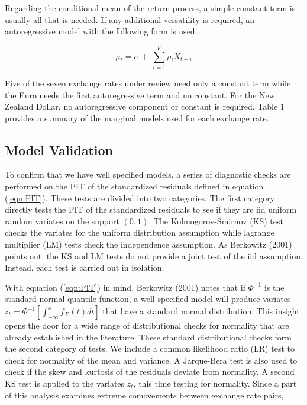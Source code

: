 \documentclass[12pt]{article}
\begin{document}
Regarding the conditional mean of the return process, a simple constant term is usually all that is needed. If any additional versatility is required, an autoregressive model with the following form is used.

\begin{equation} \label{eqn:AR}
\mu_{t} = c ~+~ \sum_{i = 1}^{p} \rho_{i} X_{t - i}
\end{equation}

Five of the seven exchange rates under review need only a constant term while the Euro needs the first autoregressive term and no constant. For the New Zealand Dollar, no autoregressive component or constant is required. Table 1 provides a summary of the marginal models used for each exchange rate.

\subsection{Model Validation}

To confirm that we have well specified models, a series of diagnostic checks are performed on the PIT of the standardized residuals defined in equation (\ref{eqn:PIT}). These tests are divided into two categories. The first category directly tests the PIT of the standardized residuals to see if they are iid uniform random variates on the support $\left(0,1\right)$. The Kolmogorov-Smirnov (KS) test checks the variates for the uniform distribution assumption while lagrange multiplier (LM) tests check the independence assumption. As Berkowitz (2001) points out, the KS and LM tests do not provide a joint test of the iid assumption. Instead, each test is carried out in isolation.

With equation (\ref{eqn:PIT}) in mind, Berkowitz (2001) notes that if $\Phi^{-1}$ is the standard normal quantile function, a well specified model will produce variates $z_{t} = \Phi^{-1}\left[\int_{-\infty}^{x} f_{X}\left(t\right) dt \right]$ that have a standard normal distribution. This insight opens the door for a wide range of distributional checks for normality that are already established in the literature. These standard distributional checks form the second category of tests. We include a common likelihood ratio (LR) test to check for normality of the mean and variance. A Jarque-Bera test is also used to check if the skew and kurtosis of the residuals deviate from normality. A second KS test is applied to the variates $z_{t}$, this time testing for normality. Since a part of this analysis examines extreme comovements between exchange rate pairs,  
\end{document}
